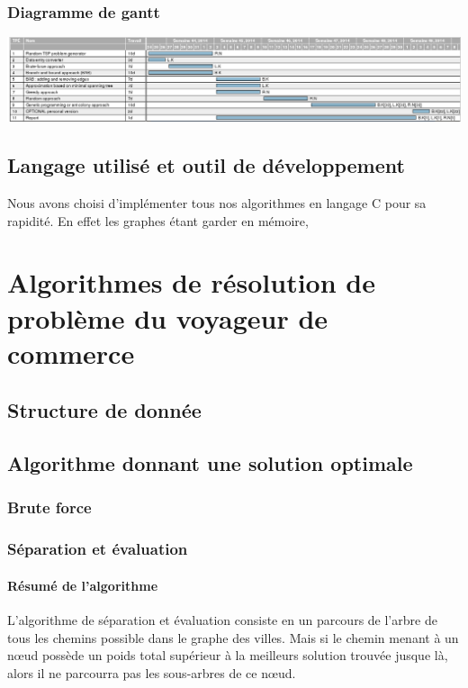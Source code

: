 \documentclass[10pt,a4paper]{report}
\begin{document}
		\subsubsection{Diagramme de gantt}
		
			\includegraphics[scale=0.37]{./Ressource/planning_AA.png}
		
	
	\subsection{Langage utilisé et outil de développement}
	\begin{flushleft}
	Nous avons choisi d'implémenter tous nos algorithmes en langage C  pour sa rapidité. En effet les graphes étant garder en mémoire, 
	\end{flushleft}
	
\section{Algorithmes de résolution de problème du voyageur de commerce}

	\subsection{Structure de donnée}
	
	\subsection{Algorithme donnant une solution optimale}
		\subsubsection{Brute force}
		
		\subsubsection{Séparation et évaluation}
		
		\paragraph{Résumé de l'algorithme}
		L'algorithme de séparation et évaluation consiste en un parcours de l'arbre de tous les chemins possible dans le graphe des villes. Mais si le chemin menant à un nœud possède un poids total supérieur à la meilleurs solution trouvée jusque là, alors il ne parcourra pas les sous-arbres de ce nœud.\\
		
\end{document}
